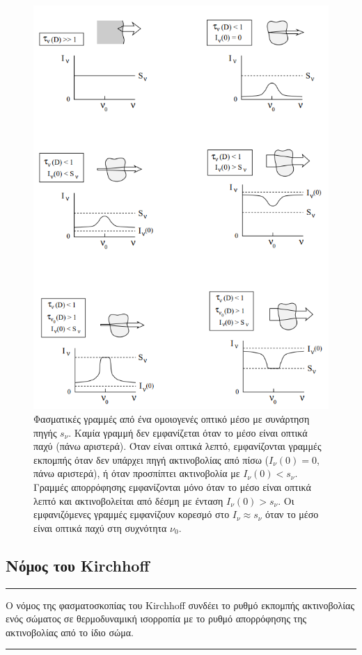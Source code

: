 \begin{figure}
    \centering
    \includegraphics[width=\textwidth]{Figures/optical_depth_examples.png}
    \caption{Φασματικές γραμμές από ένα ομοιογενές οπτικό μέσο με συνάρτηση πηγής $s_{\nu}$. Καμία γραμμή δεν εμφανίζεται όταν το μέσο είναι οπτικά παχύ (πάνω αριστερά). Όταν είναι οπτικά λεπτό, εμφανίζονται γραμμές εκπομπής όταν δεν υπάρχει πηγή ακτινοβολίας από πίσω ($I_{\nu}(0) = 0$, πάνω αριστερά), ή όταν προσπίπτει ακτινοβολία με $I_{\nu}(0) < s_{\nu}$. Γραμμές απορρόφησης εμφανίζονται μόνο όταν το μέσο είναι οπτικά λεπτό και ακτινοβολείται από δέσμη με ένταση $I_{\nu}(0) > s_{\nu}$. Οι εμφανιζόμενες γραμμές εμφανίζουν κορεσμό στο $I_{\nu} \approx s_{\nu}$ όταν το μέσο είναι οπτικά παχύ στη συχνότητα $\nu_0$.}
    \label{fig:optical_depth_examples}
\end{figure}


\subsection{Νόμος του Kirchhoff}
{\color{red} \hrule}
Ο νόμος της φασματοσκοπίας του Kirchhoff συνδέει το ρυθμό εκπομπής ακτινοβολίας ενός σώματος σε θερμοδυναμική ισορροπία με το ρυθμό απορρόφησης της ακτινοβολίας από το ίδιο σώμα.\\
{\color{red} \hrule}

